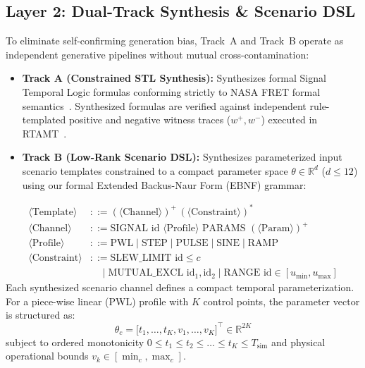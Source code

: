 \documentclass[journal]{IEEEtran}
\begin{document}
\subsection{Layer 2: Dual-Track Synthesis \& Scenario DSL}
To eliminate self-confirming generation bias, Track~A and Track~B operate as independent generative pipelines without mutual cross-contamination:
\begin{itemize}
    \item \textbf{Track A (Constrained STL Synthesis):} Synthesizes formal Signal Temporal Logic formulas conforming strictly to NASA FRET formal semantics~\cite{giannakopoulou2020formal}. Synthesized formulas are verified against independent rule-templated positive and negative witness traces ($w^+, w^-$) executed in RTAMT~\cite{nickovic2020rtamt}.
    \item \textbf{Track B (Low-Rank Scenario DSL):} Synthesizes parameterized input scenario templates constrained to a compact parameter space $\theta \in \mathbb{R}^d$ ($d \le 12$) using our formal Extended Backus-Naur Form (EBNF) grammar:
\end{itemize}
\begin{align*}
\langle\text{Template}\rangle &::= (\langle\text{Channel}\rangle)^+ \, (\langle\text{Constraint}\rangle)^* \\
\langle\text{Channel}\rangle &::= \text{SIGNAL } \text{id } \langle\text{Profile}\rangle \text{ PARAMS } (\langle\text{Param}\rangle)^+ \\
\langle\text{Profile}\rangle &::= \text{PWL} \mid \text{STEP} \mid \text{PULSE} \mid \text{SINE} \mid \text{RAMP} \\
\langle\text{Constraint}\rangle &::= \text{SLEW\_LIMIT } \text{id} \le c \\
&\quad\mid \text{MUTUAL\_EXCL } \text{id}_1, \text{id}_2 \mid \text{RANGE } \text{id} \in [u_{\min}, u_{\max}]
\end{align*}
Each synthesized scenario channel defines a compact temporal parameterization. For a piece-wise linear (PWL) profile with $K$ control points, the parameter vector is structured as:
\begin{equation}
\theta_c = \big[t_1, \dots, t_K, v_1, \dots, v_K\big]^\top \in \mathbb{R}^{2K}
\end{equation}
subject to ordered monotonicity $0 \le t_1 \le t_2 \le \dots \le t_K \le T_{\mathrm{sim}}$ and physical operational bounds $v_k \in [\min_c, \max_c]$. 
\end{document}

